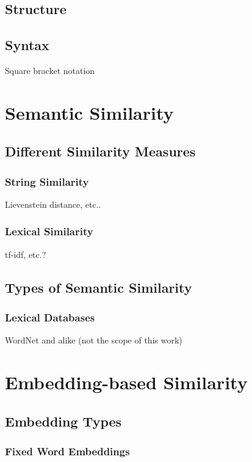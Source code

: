 \documentclass[11pt]{scrreprt}
\begin{document}
\subsection{Structure}

\subsection{Syntax}

Square bracket notation 


\section{Semantic Similarity}

\subsection{Different Similarity Measures}

\subsubsection{String Similarity}
Lievenstein distance, etc..

\subsubsection{Lexical Similarity}
tf-idf, etc.?

\subsection{Types of Semantic Similarity}

\subsubsection{Lexical Databases}
WordNet and alike (not the scope of this work)


\section{Embedding-based Similarity}

\subsection{Embedding Types}

\subsubsection{Fixed Word Embeddings}
\end{document}
